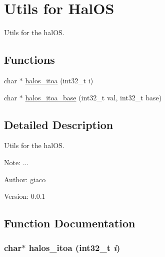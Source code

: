 \hypertarget{group___u_t_i_l_i_t_y_s}{
\section{Utils for HalOS}
\label{group___u_t_i_l_i_t_y_s}
}
Utils for the halOS.  


\subsection*{Functions}
\begin{CompactItemize}
\item 
char $\ast$ \hyperlink{group___u_t_i_l_i_t_y_s_g39795a495bf6886a2afe876815d69c88}{halos\_\-itoa} (int32\_\-t i)
\item 
char $\ast$ \hyperlink{group___u_t_i_l_i_t_y_s_gb12af2d83412a582fc6ee7805cd64e94}{halos\_\-itoa\_\-base} (int32\_\-t val, int32\_\-t base)
\end{CompactItemize}


\subsection{Detailed Description}
Utils for the halOS. 

\begin{Desc}
\item[Note:]... \end{Desc}
\begin{Desc}
\item[Author:]giaco \end{Desc}
\begin{Desc}
\item[Version:]0.0.1 \end{Desc}


\subsection{Function Documentation}
\hypertarget{group___u_t_i_l_i_t_y_s_g39795a495bf6886a2afe876815d69c88}{
\subsubsection[{halos\_\-itoa}]{\setlength{\rightskip}{0pt plus 5cm}char$\ast$ halos\_\-itoa (int32\_\-t {\em i})}}
\label{group___u_t_i_l_i_t_y_s_g39795a495bf6886a2afe876815d69c88}


